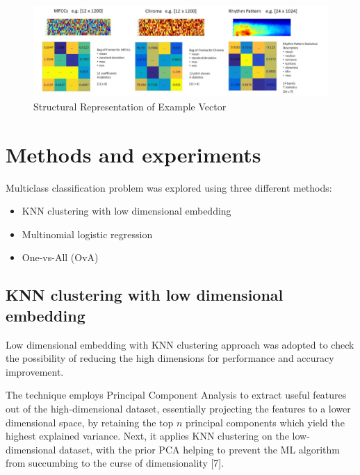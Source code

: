 \documentclass[journal]{IEEEtran}
\begin{document}
\begin{figure}[h!]
	\begin{center}
		\includegraphics[width=\columnwidth]{images/1_ExampleVectorStructure_2.PNG}
		\caption{Structural Representation of Example Vector}
		\label{fig:Fig.3}
	\end{center}
\end{figure}

\section{Methods and experiments}
Multiclass classification problem was explored using three different methods: \par
\begin{itemize}
	\item KNN clustering with low dimensional embedding
	\item Multinomial logistic regression
	\item One-vs-All (OvA)
\end{itemize}

\subsection{KNN clustering with low dimensional embedding}
Low dimensional embedding with KNN clustering approach was adopted to check the possibility of reducing the high dimensions for performance and accuracy improvement.\par

The technique employs Principal Component Analysis to extract useful features out of the high-dimensional dataset, essentially projecting the features to a lower dimensional space, by retaining the top $n$ principal components which yield the highest explained variance. Next, it applies KNN clustering on the low-dimensional dataset, with the prior PCA helping to prevent the ML algorithm from succumbing to the curse of dimensionality [7]. \par
\end{document}
